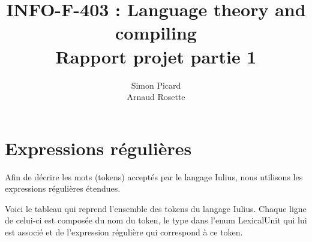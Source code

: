 \documentclass[a4paper,10pt]{article}
\title{INFO-F-403 : Language theory and compiling \\ Rapport projet partie 1}
\author{Simon Picard \\ Arnaud Rosette}
\begin{document}
\maketitle


\section{Expressions régulières}

Afin de décrire les mots (tokens) acceptés par le langage Iulius, nous utilisons les expressions régulières étendues.

Voici le tableau qui reprend l'ensemble des tokens du langage Iulius. Chaque ligne de celui-ci est composée du nom du token, le type dans l'enum LexicalUnit qui lui est associé et de l'expression régulière qui correspond à ce token.
\end{document}
